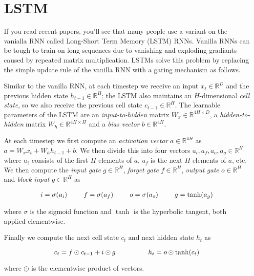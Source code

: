 \documentclass[11pt]{article}
\begin{document}
    \hypertarget{lstm}{%
\section{LSTM}\label{lstm}}

If you read recent papers, you'll see that many people use a variant on
the vanialla RNN called Long-Short Term Memory (LSTM) RNNs. Vanilla RNNs
can be tough to train on long sequences due to vanishing and exploding
gradiants caused by repeated matrix multiplication. LSTMs solve this
problem by replacing the simple update rule of the vanilla RNN with a
gating mechanism as follows.

Similar to the vanilla RNN, at each timestep we receive an input
\(x_t\in\mathbb{R}^D\) and the previous hidden state
\(h_{t-1}\in\mathbb{R}^H\); the LSTM also maintains an \(H\)-dimensional
\emph{cell state}, so we also receive the previous cell state
\(c_{t-1}\in\mathbb{R}^H\). The learnable parameters of the LSTM are an
\emph{input-to-hidden} matrix \(W_x\in\mathbb{R}^{4H\times D}\), a
\emph{hidden-to-hidden} matrix \(W_h\in\mathbb{R}^{4H\times H}\) and a
\emph{bias vector} \(b\in\mathbb{R}^{4H}\).

At each timestep we first compute an \emph{activation vector}
\(a\in\mathbb{R}^{4H}\) as \(a=W_xx_t + W_hh_{t-1}+b\). We then divide
this into four vectors \(a_i,a_f,a_o,a_g\in\mathbb{R}^H\) where \(a_i\)
consists of the first \(H\) elements of \(a\), \(a_f\) is the next \(H\)
elements of \(a\), etc. We then compute the \emph{input gate}
\(g\in\mathbb{R}^H\), \emph{forget gate} \(f\in\mathbb{R}^H\),
\emph{output gate} \(o\in\mathbb{R}^H\) and \emph{block input}
\(g\in\mathbb{R}^H\) as

\begin{align*}
i = \sigma(a_i) \hspace{2pc}
f = \sigma(a_f) \hspace{2pc}
o = \sigma(a_o) \hspace{2pc}
g = \tanh(a_g)
\end{align*}

where \(\sigma\) is the sigmoid function and \(\tanh\) is the hyperbolic
tangent, both applied elementwise.

Finally we compute the next cell state \(c_t\) and next hidden state
\(h_t\) as

\[
c_{t} = f\odot c_{t-1} + i\odot g \hspace{4pc}
h_t = o\odot\tanh(c_t)
\]

where \(\odot\) is the elementwise product of vectors.
\end{document}
